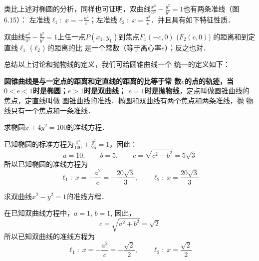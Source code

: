 \begin{figure}[htp]
    \centering
{}
    \caption{}
\end{figure}

类比上述对椭圆的分析，同样也可证明，双曲线$\frac{x^2}{a^2}-\frac{y^2}{b^2}=1$也有两条准线（图6.15）：
左准线$\ell_1:\; x=-\frac{a^2}{c}$；左准线$\ell_2:\; x=\frac{a^2}{c}$．并且具有如下特征性质．

双曲线$\frac{x^2}{a^2}-\frac{y^2}{b^2}=1$上任一点$P(x_1,y_1)$到焦点$F_1(-c,
0)$ ($F_2(c,0)$) 的距离和到定直线$\ell_1$ ($\ell_2$) 的距离的比
是一个常数（等于离心率$e$）；反之也对．

总结以上讨论和抛物线的定义，我们可给圆锥曲线一个
统一的定义如下：

\textbf{圆锥曲线是与一定点的距离和定直线的距离的比等于常
数$e$的点的轨迹，当$0<e<1$时是椭圆；$e>1$时是双曲线；
$e=1$时是抛物线}，定点叫做圆锥曲线的焦点，定直线叫做
圆锥曲线的准线．椭圆和双曲线有两个焦点和两条准线，抛
物线只有一个焦点和一条准线．

\begin{example}
    求椭圆$x+4y^2=100$的准线方程．
\end{example}

\begin{solution}
    已知椭圆的标准方程为$\frac{x^2}{100}+\frac{y^2}{25}=1$，因此：
\[a=10,\qquad b=5,\qquad c=\sqrt{c^2-b^2}=5\sqrt{3}\]
所以已知椭圆的准线方程为
\[\ell_1:\; x=-\frac{a^2}{c}=-\frac{20\sqrt{3}}{3},\qquad \ell_2:\; x=\frac{20\sqrt{3}}{3}\]
\end{solution}

\begin{example}
    求双曲线$x^2-y^2=1$的准线方程．
\end{example}



\begin{solution}
在已知双曲线方程中，$a=1$, $b=1$, 因此，
\[c=\sqrt{a^2+b^2}=\sqrt{2}\]
所以已知双曲线的准线方程为
\[\ell_1:\; x=-\frac{a^2}{c}=-\frac{\sqrt{2}}{2},\qquad  \ell_2:\; x=\frac{\sqrt{2}}{2}\]
\end{solution}

